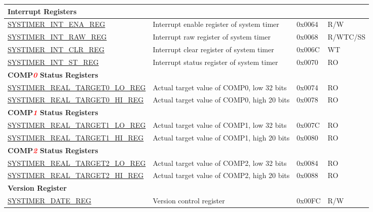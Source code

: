 \begin{longtable}{ | p{6cm} | p{7.2cm} | p{1.3cm} | p{1cm} | }
\multicolumn{4}{|l|}{\textbf{Interrupt Registers}} \\ \hline
\hyperref[regdesc:SYSTIMERINTENAREG]{SYSTIMER\_INT\_ENA\_REG} & Interrupt enable register of system timer & 0x0064 & R/W \\ \hline
\hyperref[regdesc:SYSTIMERINTRAWREG]{SYSTIMER\_INT\_RAW\_REG} & Interrupt raw register of system timer & 0x0068 & R/WTC/SS \\ \hline
\hyperref[regdesc:SYSTIMERINTCLRREG]{SYSTIMER\_INT\_CLR\_REG} & Interrupt clear register of system timer & 0x006C & WT \\ \hline
\hyperref[regdesc:SYSTIMERINTSTREG]{SYSTIMER\_INT\_ST\_REG} & Interrupt status register of system timer & 0x0070 & RO \\ \hline
\multicolumn{4}{|l|}{\textbf{COMP\textcolor{red}{\it{0}} Status Registers}} \\ \hline
\hyperref[regdesc:SYSTIMERREALTARGET0LOREG]{SYSTIMER\_REAL\_TARGET0\_LO\_REG} & Actual target value of COMP0, low 32 bits & 0x0074 & RO \\ \hline
\hyperref[regdesc:SYSTIMERREALTARGET0HIREG]{SYSTIMER\_REAL\_TARGET0\_HI\_REG} & Actual target value of COMP0, high 20 bits & 0x0078 & RO \\ \hline
\multicolumn{4}{|l|}{\textbf{COMP\textcolor{red}{\it{1}} Status Registers}} \\ \hline
\hyperref[regdesc:SYSTIMERREALTARGET1LOREG]{SYSTIMER\_REAL\_TARGET1\_LO\_REG} & Actual target value of COMP1, low 32 bits & 0x007C & RO \\ \hline
\hyperref[regdesc:SYSTIMERREALTARGET1HIREG]{SYSTIMER\_REAL\_TARGET1\_HI\_REG} & Actual target value of COMP1, high 20 bits & 0x0080 & RO \\ \hline
\multicolumn{4}{|l|}{\textbf{COMP\textcolor{red}{\it{2}} Status Registers}} \\ \hline
\hyperref[regdesc:SYSTIMERREALTARGET2LOREG]{SYSTIMER\_REAL\_TARGET2\_LO\_REG} & Actual target value of COMP2, low 32 bits & 0x0084 & RO \\ \hline
\hyperref[regdesc:SYSTIMERREALTARGET2HIREG]{SYSTIMER\_REAL\_TARGET2\_HI\_REG} & Actual target value of COMP2, high 20 bits & 0x0088 & RO \\ \hline
\multicolumn{4}{|l|}{\textbf{Version Register}} \\ \hline
\hyperref[regdesc:SYSTIMERDATEREG]{SYSTIMER\_DATE\_REG} & Version control register & 0x00FC & R/W \\ \hline
\end{longtable}
